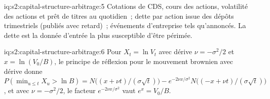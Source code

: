 \begin{solution}{iq:s2:capital-structure-arbitrage:5}
Cotations de CDS, cours des actions, volatilité des actions et prêt de titres au quotidien~; dette par action issue des dépôts trimestriels (publiés avec retard)~; événements d'entreprise tels qu'annoncés. La dette est la
donnée d'entrée la plus susceptible d'être périmée.
\end{solution}

\begin{solution}{iq:s2:capital-structure-arbitrage:6}
Pour $X_t = \ln V_t$ avec dérive $\nu = -\sigma^2/2$ et $x = \ln(V_0/B)$, le principe de réflexion pour le mouvement brownien avec dérive donne
$P(\min_{u \le t} X_u > \ln B) = N\big((x + \nu t)/(\sigma\sqrt t)\big) - e^{-2\nu x/\sigma^2}N\big((-x + \nu t)/(\sigma\sqrt t)\big)$, et avec
$\nu = -\sigma^2/2$, le facteur $e^{-2\nu x/\sigma^2}$ vaut $e^{x} = V_0/B$.
\end{solution}
